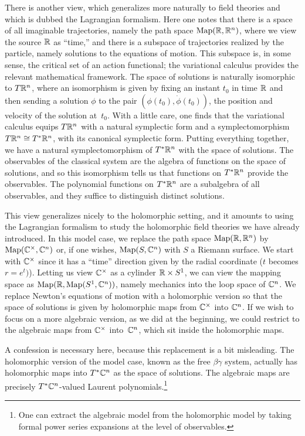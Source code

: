 \documentclass[11pt]{amsart}
\begin{document}
There is another view, which generalizes more naturally to field theories and which is dubbed the Lagrangian formalism.
Here one notes that there is a space of all imaginable trajectories, namely the path space ${\rm Map}(\mathbb R, \mathbb R^n)$, where we view the source $\mathbb R$ as ``time,''
and there is a subspace of trajectories realized by the particle, namely solutions to the equations of motion.
This subspace is, in some sense, the critical set of an action functional; 
the variational calculus provides the relevant mathematical framework.
The space of solutions is naturally isomorphic to $T \mathbb R^n$,
where an isomorphism is given by fixing an instant $t_0$ in time $\mathbb R$ and then sending a solution $\phi$ to the pair $(\phi(t_0), \dot{\phi}(t_0))$, the position and velocity of the solution at~$t_0$.
With a little care, one finds that the variational calculus equips $T \mathbb R^n$ with a natural symplectic form and a symplectomorphism $T\mathbb R^n \cong T^* \mathbb R^n$, with its canonical symplectic form. 
Putting everything together, we have a natural symplectomorphism of $T^* \mathbb R^n$ with the space of solutions.
The observables of the classical system are the algebra of functions on the space of solutions,
and so this isomorphism tells us that functions on $T^* \mathbb R^n$ provide the observables.
The polynomial functions on $T^* \mathbb R^n$ are a subalgebra of all observables, 
and they suffice to distinguish distinct solutions.

This view generalizes nicely to the holomorphic setting,
and it amounts to using the Lagrangian formalism to study the holomorphic field theories we have already introduced.
In this model case, we replace the path space ${\rm Map}(\mathbb R, \mathbb R^n)$ by ${\rm Map}(\mathbb C^\times, \mathbb C^n)$ or, if one wishes, ${\rm Map}(S, \mathbb C^n)$ with $S$ a Riemann surface.
We start with $\mathbb C^\times$ since it has a ``time'' direction given by the radial coordinate ($t$ becomes $r = e^t)$).
Letting us view $\mathbb C^\times$ as a cylinder $\mathbb R \times S^1$, we can view the mapping space as  ${\rm Map}(\mathbb R, {\rm Map}(S^1,\mathbb C^n))$, namely mechanics into the loop space of $\mathbb C^n$.
We replace Newton's equations of motion with a holomorphic version
so that the space of solutions is given by holomorphic maps from $\mathbb C^\times$ into $\mathbb C^n$.
If we wish to focus on a more algebraic version, as we did at the beginning,
we could restrict to the algebraic maps from $\mathbb C^\times$ into~$\mathbb C^n$,
which sit inside the holomorphic maps.

A confession is necessary here, because this replacement is a bit misleading.
The holomorphic version of the model case, known as the free $\beta\gamma$ system,
actually has holomorphic maps into $T^* \mathbb C^n$ as the space of solutions.
The algebraic maps are precisely $T^* \mathbb C^n$-valued Laurent polynomials.\footnote{One can extract the algebraic model from the holomorphic model by taking formal power series expansions at the level of observables.}
\end{document}
